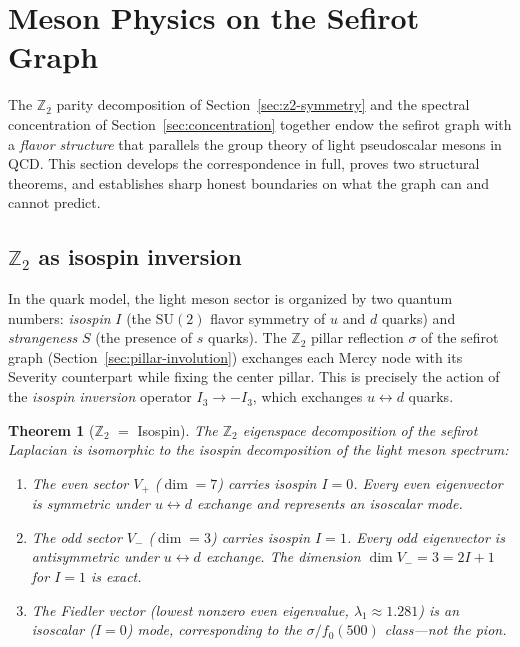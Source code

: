 \documentclass[11pt,a4paper]{amsart}
\newtheorem{theorem}{Theorem}[section]
\theoremstyle{remark}
\newcommand{\bbZ}{\mathbb{Z}}
\begin{document}
\section{Meson Physics on the Sefirot Graph}
\label{sec:meson}

The $\bbZ_2$ parity decomposition of Section~\ref{sec:z2-symmetry} and the
spectral concentration of Section~\ref{sec:concentration} together endow
the sefirot graph with a \emph{flavor structure} that parallels the group
theory of light pseudoscalar mesons in QCD. This section develops the
correspondence in full, proves two structural theorems, and establishes
sharp honest boundaries on what the graph can and cannot predict.

\subsection{$\bbZ_2$ as isospin inversion}
\label{sec:z2-isospin}

In the quark model, the light meson sector is organized by two quantum
numbers: \emph{isospin} $I$ (the $\mathrm{SU}(2)$ flavor symmetry of $u$ and
$d$ quarks) and \emph{strangeness} $S$ (the presence of $s$ quarks). The
$\bbZ_2$ pillar reflection $\sigma$ of the sefirot graph
(Section~\ref{sec:pillar-involution}) exchanges each Mercy node with its
Severity counterpart while fixing the center pillar. This is precisely the
action of the \emph{isospin inversion} operator $I_3 \to -I_3$, which
exchanges $u \leftrightarrow d$ quarks.

\begin{theorem}[$\bbZ_2$ $=$ Isospin]
\label{thm:z2-isospin}
The $\bbZ_2$ eigenspace decomposition of the sefirot Laplacian is
isomorphic to the isospin decomposition of the light meson spectrum:
\begin{enumerate}[leftmargin=*,label=\textup{(\roman*)}]
\item The even sector $V_+$ ($\dim = 7$) carries isospin $I = 0$. Every
  even eigenvector is symmetric under $u \leftrightarrow d$ exchange and
  represents an isoscalar mode.
\item The odd sector $V_-$ ($\dim = 3$) carries isospin $I = 1$. Every odd
  eigenvector is antisymmetric under $u \leftrightarrow d$ exchange. The
  dimension $\dim V_- = 3 = 2I + 1$ for $I = 1$ is exact.
\item The Fiedler vector (lowest nonzero even eigenvalue,
  $\lambda_1 \approx 1.281$) is an isoscalar ($I = 0$) mode, corresponding
  to the $\sigma/f_0(500)$ class---not the pion.
\end{enumerate}
\end{theorem}
\end{document}
